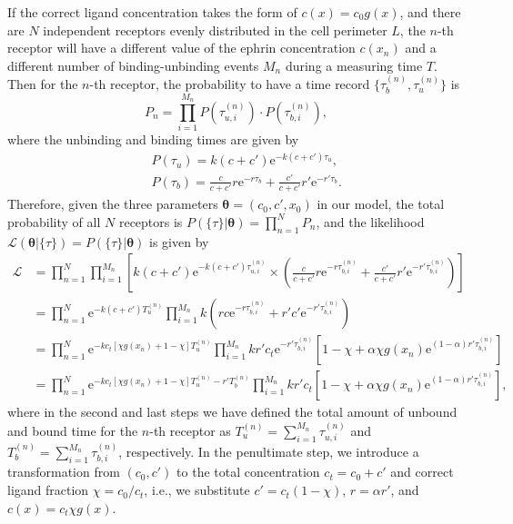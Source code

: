 If the correct ligand concentration takes the form of $c(x)=c_0 g(x)$, and there are $N$ independent receptors evenly distributed in the cell perimeter $L$, the $n$-th receptor will have a different value of the ephrin concentration $c(x_n)$ and a different number of binding-unbinding events $M_n$ during a measuring time $T$.
Then for the $n$-th receptor, the probability to have a time record $\{\tau_b^{(n)},\tau_u^{(n)}\}$ is
\begin{equation}
P_n=\prod_{i=1}^{M_n}P(\tau_{u,i}^{(n)})\cdot P(\tau_{b,i}^{(n)}),
\end{equation}
where the unbinding and binding times are given by
\begin{eqnarray}
    &&P(\tau_u)=k(c+c')\mathrm{e}^{-k(c+c')\tau_u},\label{eq:ch5:p-tu-app}\\
    &&P(\tau_b)=\frac{c}{c+c'}r\mathrm{e}^{-r\tau_b} + \frac{c'}{c+c'}r'\mathrm{e}^{-r'\tau_b}.\label{eq:ch5:p-tb-app}
\end{eqnarray}
Therefore, given the three parameters $\boldsymbol{\theta}=(c_0, c', x_0)$ in our model, the total probability of all $N$ receptors is $P(\{\tau\}|\boldsymbol{\theta})=\prod_{n=1}^N P_n$,
and the likelihood $\mathcal{L}(\boldsymbol{\theta}|\{\tau\})=P(\{\tau\}|\boldsymbol{\theta})$ is given by
\begin{align}
    \mathcal{L}&=\prod_{n=1}^N\prod_{i=1}^{M_n}\left[k(c+c')\mathrm{e}^{-k(c+c')\tau_{u,i}^{(n)}}\times\left(\frac{c}{c+c'}r\mathrm{e}^{-r\tau_{b,i}^{(n)}}+\frac{c'}{c+c'}r'\mathrm{e}^{-r'\tau_{b,i}^{(n)}}\right)\right]\nonumber\\
    &=\prod_{n=1}^N\mathrm{e}^{-k(c+c')T_{u}^{(n)}}\prod_{i=1}^{M_n}k\left(rc\mathrm{e}^{-r\tau_{b,i}^{(n)}}+r'c'\mathrm{e}^{-r'\tau_{b,i}^{(n)}}\right)\nonumber\\
    &=\prod_{n=1}^N\mathrm{e}^{-kc_t[\chi g(x_n) +1-\chi]T_{u}^{(n)}}\prod_{i=1}^{M_n}kr'c_t\mathrm{e}^{-r'\tau_{b,i}^{(n)}}\left[1-\chi+\alpha\chi g(x_n)\mathrm{e}^{(1-\alpha)r'\tau_{b,i}^{(n)}}\right]\nonumber\\
    &=\prod_{n=1}^N\mathrm{e}^{-kc_t[\chi g(x_n) +1-\chi]T_{u}^{(n)}-r'T_b^{(n)}}\prod_{i=1}^{M_n}kr'c_t\left[1-\chi+\alpha\chi g(x_n)\mathrm{e}^{(1-\alpha)r'\tau_{b,i}^{(n)}}\right],\nonumber
\end{align}
where in the second and last steps we have defined the total amount of unbound and bound time for the $n$-th receptor as $T_u^{(n)} = \sum_{i=1}^{M_n} \tau_{u,i}^{(n)}$ and $T_b^{(n)} = \sum_{i=1}^{M_n} \tau_{b,i}^{(n)}$, respectively.
In the penultimate step, we introduce a transformation from $(c_0, c')$ to the total concentration $c_t=c_0+c'$ and correct ligand fraction $\chi=c_0/c_t$, i.e., we substitute $c'=c_t(1-\chi)$, $r=\alpha r'$, and $c(x)=c_t\chi g(x)$.
